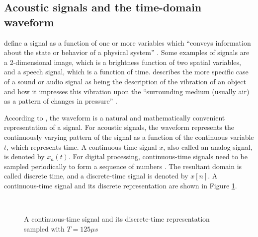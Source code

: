 \documentclass[report.tex]{subfiles}
\begin{document}
\subsection{Acoustic signals and the time-domain waveform}
\label{sec:timedomain}

\citeauthor{discretebook} define a signal as a function of one or more variables which ``conveys information about the state or behavior of a physical system'' \parencite[8]{discretebook}. Some examples of signals are a 2-dimensional image, which is a brightness function of two spatial variables, and a speech signal, which is a function of time. \citeauthor{moore} describes the more specific case of a sound or audio signal as being the description of the vibration of an object and how it impresses this vibration upon the ``surrounding medium (usually air) as a pattern of changes in pressure'' \parencite[2]{moore}.

According to \textcite{melbook}, the waveform is a natural and mathematically convenient representation of a signal. For acoustic signals, the waveform represents the continuously varying pattern of the signal as a function of the continuous variable $t$, which represents time. A continuous-time signal $x$, also called an analog signal, is denoted by $x_{a}(t)$. For digital processing, continuous-time signals need to be sampled periodically to form a sequence of numbers \parencite{discretebook}. The resultant domain is called discrete time, and a discrete-time signal is denoted by $x[n]$.  A continuous-time signal and its discrete representation are shown in Figure \ref{fig:discretecontinuous}.

\begin{figure}[ht]
	\centering
	\\
	\caption{A continuous-time signal and its discrete-time representation sampled with $T = 125\mu s$ \parencite[10]{discretebook}}
	\label{fig:discretecontinuous}
\end{figure}
\end{document}
